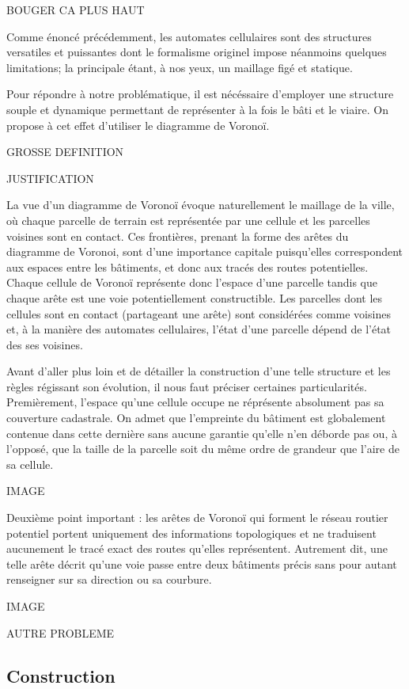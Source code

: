 \documentclass[10pt]{article}
\begin{document}
BOUGER CA PLUS HAUT

Comme énoncé précédemment, les automates cellulaires sont des
structures versatiles et puissantes dont le formalisme originel impose
néanmoins quelques limitations; la principale étant, à nos yeux, un
maillage figé et statique.

Pour répondre à notre problématique, il est nécéssaire d'employer une
structure souple et dynamique permettant de représenter à la fois le
bâti et le viaire. On propose à cet effet d'utiliser le diagramme de
Voronoï.

GROSSE DEFINITION

JUSTIFICATION

La vue d'un diagramme de Voronoï évoque naturellement le maillage de
la ville, où chaque parcelle de terrain est représentée par une
cellule et les parcelles voisines sont en contact. Ces frontières,
prenant la forme des arêtes du diagramme de Voronoi, sont d'une
importance capitale puisqu'elles correspondent aux espaces entre les
bâtiments, et donc aux tracés des routes potentielles. Chaque cellule
de Voronoï représente donc l'espace d'une parcelle tandis que chaque
arête est une voie potentiellement constructible. Les parcelles dont
les cellules sont en contact (partageant une arête) sont considérées
comme voisines et, à la manière des automates cellulaires, l'état
d'une parcelle dépend de l'état des ses voisines.

Avant d'aller plus loin et de détailler la construction d'une telle
structure et les règles régissant son évolution, il nous faut préciser
certaines particularités. Premièrement, l'espace qu'une cellule occupe
ne réprésente absolument pas sa couverture cadastrale. On admet que
l'empreinte du bâtiment est globalement contenue dans cette dernière
sans aucune garantie qu'elle n'en déborde pas ou, à l'opposé, que la
taille de la parcelle soit du même ordre de grandeur que l'aire de sa
cellule.

IMAGE

Deuxième point important : les arêtes de Voronoï qui forment le réseau
routier potentiel portent uniquement des informations topologiques et
ne traduisent aucunement le tracé exact des routes qu'elles
représentent. Autrement dit, une telle arête décrit qu'une voie passe
entre deux bâtiments précis sans pour autant renseigner sur sa
direction ou sa courbure.

IMAGE

AUTRE PROBLEME

\subsection{Construction}
\end{document}
